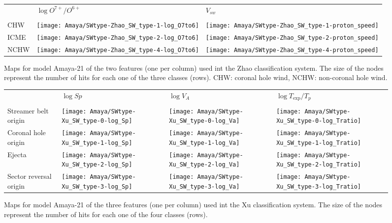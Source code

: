 \documentclass[utf8]{frontiersSCNS} %
\begin{document}
\begin{figure}[h!]\centering
	\begin{tabular}{m{1cm}CC}
		 & $\log O^{7+}/O^{6+}$ & $V_{sw}$ \\ \\
		CHW & \texttt{[image: Amaya/SWtype-Zhao\_SW\_type-1-log\_O7to6]} &
		\texttt{[image: Amaya/SWtype-Zhao\_SW\_type-1-proton\_speed]}\hfill	\\
		ICME & \texttt{[image: Amaya/SWtype-Zhao\_SW\_type-2-log\_O7to6]} &
		\texttt{[image: Amaya/SWtype-Zhao\_SW\_type-2-proton\_speed]}\hfill	\\
		NCHW & \texttt{[image: Amaya/SWtype-Zhao\_SW\_type-4-log\_O7to6]} &
		\texttt{[image: Amaya/SWtype-Zhao\_SW\_type-4-proton\_speed]}\hfill \\
	\end{tabular}
	\caption{Maps for model Amaya-21 of the two features (one per column) used int the Zhao classification system. The size of the nodes represent the number of hits for each one of the three classes (rows). CHW: coronal hole wind, NCHW: non-coronal hole wind.}\label{fig:SWtypeZ}
\end{figure}

\begin{figure}[h!]\centering
	\begin{tabular}{m{2.5cm}CCC}
		& $\log Sp$ & $\log V_{A}$ & $\log T_{\text{exp}}/T_p$ \\ \\
		Streamer belt origin & \texttt{[image: Amaya/SWtype-Xu\_SW\_type-0-log\_Sp]} &
		\texttt{[image: Amaya/SWtype-Xu\_SW\_type-0-log\_Va]} &
		\texttt{[image: Amaya/SWtype-Xu\_SW\_type-0-log\_Tratio]} \hfill	\\
		
		Coronal hole origin & \texttt{[image: Amaya/SWtype-Xu\_SW\_type-1-log\_Sp]} &
		\texttt{[image: Amaya/SWtype-Xu\_SW\_type-1-log\_Va]} &
		\texttt{[image: Amaya/SWtype-Xu\_SW\_type-1-log\_Tratio]} \hfill	\\
		
		Ejecta & \texttt{[image: Amaya/SWtype-Xu\_SW\_type-2-log\_Sp]} &
		\texttt{[image: Amaya/SWtype-Xu\_SW\_type-2-log\_Va]} &
		\texttt{[image: Amaya/SWtype-Xu\_SW\_type-2-log\_Tratio]} \hfill	\\
		
		Sector reversal origin & \texttt{[image: Amaya/SWtype-Xu\_SW\_type-3-log\_Sp]} &
		\texttt{[image: Amaya/SWtype-Xu\_SW\_type-3-log\_Va]} &
		\texttt{[image: Amaya/SWtype-Xu\_SW\_type-3-log\_Tratio]} \hfill	\\
	\end{tabular}
	\caption{Maps for model Amaya-21 of the three features (one per column) used int the Xu classification system. The size of the nodes represent the number of hits for each one of the four classes (rows).}\label{fig:SWtXu}
\end{figure}
\end{document}
